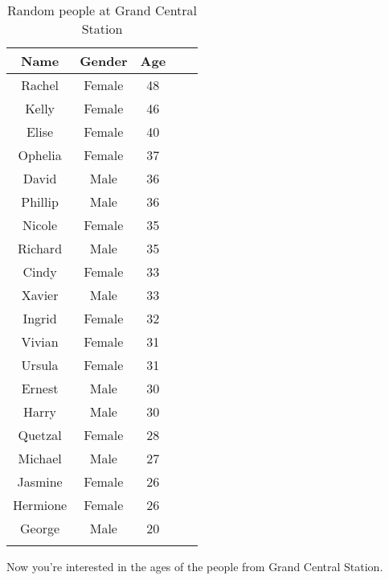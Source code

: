 \documentclass[11pt]{exam}
\begin{document}
\begin{questions}
\begin{table}[ht]
\begin{center}
\begin{tabular}{|c|c|c|p{3cm}|p{3cm}|}
  \hline
Name & Gender & Age &  &  \\ 
  \hline
Rachel & Female & 48 &  &  \\ 
   \hline
Kelly & Female & 46 &  &  \\ 
   \hline
Elise & Female & 40 &  &  \\ 
   \hline
Ophelia & Female & 37 &  &  \\ 
   \hline
David & Male & 36 &  &  \\ 
   \hline
Phillip & Male & 36 &  &  \\ 
   \hline
Nicole & Female & 35 &  &  \\ 
   \hline
Richard & Male & 35 &  &  \\ 
   \hline
Cindy & Female & 33 &  &  \\ 
   \hline
Xavier & Male & 33 &  &  \\ 
   \hline
Ingrid & Female & 32 &  &  \\ 
   \hline
Vivian & Female & 31 &  &  \\ 
   \hline
Ursula & Female & 31 &  &  \\ 
   \hline
Ernest & Male & 30 &  &  \\ 
   \hline
Harry & Male & 30 &  &  \\ 
   \hline
Quetzal & Female & 28 &  &  \\ 
   \hline
Michael & Male & 27 &  &  \\ 
   \hline
Jasmine & Female & 26 &  &  \\ 
   \hline
Hermione & Female & 26 &  &  \\ 
   \hline
George & Male & 20 &  &  \\ 
   \hline
\hline
 &  &  &  &  \\ 
   \hline
\end{tabular}
\caption{Random people at Grand Central Station}
\label{tab:ages}
\end{center}
\end{table}\fi

  \question Now you're interested in the ages of the people from Grand
  Central Station.

\end{questions}
\end{document}
